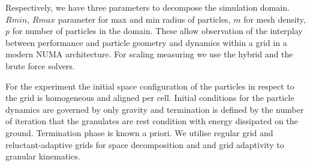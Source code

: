 \documentclass[times,12pt]{article}
\begin{document}
Respectively, we have three parameters to decompose the simulation domain. $Rmin$, $Rmax$ parameter for max and min radius of particles, $m$ for mesh density, $p$ for number of particles in the domain. These allow observation of the interplay between performance and particle geometry and dynamics within a grid in a modern NUMA architecture. For scaling measuring we use the hybrid and the brute force solvers.

For the experiment the initial space configuration of the particles in respect to the grid is homogeneous and aligned per cell. Initial conditions for the particle dynamics are governed by only gravity and termination is defined by the number of iteration that the granulates are rest condition with energy dissipated on the ground. Termination phase is known a priori. We utilise regular grid and reluctant-adaptive grids for space decomposition and and grid adaptivity to granular kinematics. 

\end{document}
